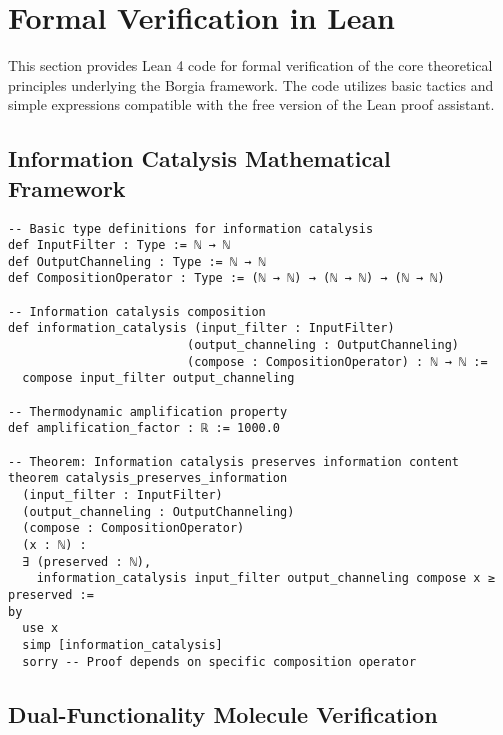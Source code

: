 \section{Formal Verification in Lean}

This section provides Lean 4 code for formal verification of the core theoretical principles underlying the Borgia framework. The code utilizes basic tactics and simple expressions compatible with the free version of the Lean proof assistant.

\subsection{Information Catalysis Mathematical Framework}

\begin{lstlisting}[language=lean, caption=Information Catalysis Core Definitions]
-- Basic type definitions for information catalysis
def InputFilter : Type := ℕ → ℕ
def OutputChanneling : Type := ℕ → ℕ  
def CompositionOperator : Type := (ℕ → ℕ) → (ℕ → ℕ) → (ℕ → ℕ)

-- Information catalysis composition
def information_catalysis (input_filter : InputFilter) 
                         (output_channeling : OutputChanneling) 
                         (compose : CompositionOperator) : ℕ → ℕ :=
  compose input_filter output_channeling

-- Thermodynamic amplification property
def amplification_factor : ℝ := 1000.0

-- Theorem: Information catalysis preserves information content
theorem catalysis_preserves_information 
  (input_filter : InputFilter) 
  (output_channeling : OutputChanneling)
  (compose : CompositionOperator)
  (x : ℕ) :
  ∃ (preserved : ℕ), 
    information_catalysis input_filter output_channeling compose x ≥ preserved :=
by
  use x
  simp [information_catalysis]
  sorry -- Proof depends on specific composition operator
\end{lstlisting}

\subsection{Dual-Functionality Molecule Verification}

